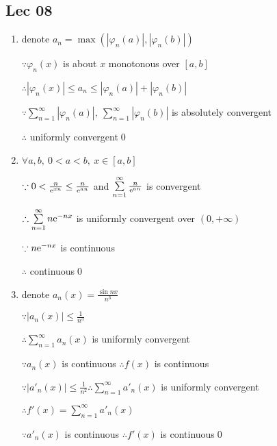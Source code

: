 \subsection{Lec 08}

\begin{enumerate}[1]
    \item denote $a_n= \max (|\varphi _n(a)|,|\varphi_n(b)|)$
    \par $\because \varphi_n(x) $ is about $x$  monotonous over $[a,b]$
    \par $\therefore |\varphi _n(x)| \leq a_n \leq |\varphi _n(a)|+|\varphi_n(b)|$
    \par $\because \sum \limits_{n=1}^{\infty} \left|\varphi_{n}(a)\right|,\ \sum \limits_{n=1}^{\infty} \left|\varphi_{n}(b)\right|$ is absolutely convergent
    \par $\therefore $ uniformly convergent\qed

    \item $ \forall a,b,\ 0<a<b, \ x \in [a,b]$
    \par $\because 0<\frac{n}{\mathrm{e}^{xn}}\leq  \frac{n}{\mathrm{e}^{an}}$ and $\sum \limits_{n=1}^{\infty} \frac{n}{\mathrm{e}^{an}}$ is convergent
    \par $\therefore \sum \limits_{n=1}^{\infty} n\mathrm{e} ^{-nx}$ is uniformly convergent over $(0,+\infty)$
    \par $\because n\mathrm{e} ^{-nx}$ is continuous
    \par $\therefore $ continuous\qed

    \item denote $ a_{n}(x)=\frac{\sin n x}{n^{3}}$
    \par $\because \left|a_{n}(x)\right| \leq \frac{1}{n^{3}}$
    \par $\therefore \sum \limits_{n=1}^{\infty} a_n(x)$ is uniformly convergent
    \par $\because a_n(x)$ is continuous $\therefore f(x)$ is continuous
    \par $\because \left|a'_{n}(x)\right| \leq \frac{1}{n^{2}}  \therefore \sum \limits_{n=1}^{\infty} a'_n(x)$ is uniformly convergent
    \par $\therefore f'(x)=\sum \limits_{n=1}^{\infty} a'_n(x)$
    \par $\because a'_n(x)$ is continuous $\therefore f'(x)$ is continuous\qed


\end{enumerate}
